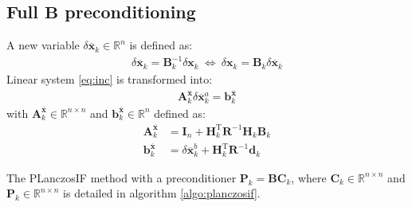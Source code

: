 \documentclass[12pt]{scrartcl}
\begin{document}
\subsection{Full $\mathbf{B}$ preconditioning}
A new variable $\delta \overline{\mathbf{x}}_k \in \mathbb{R}^n$ is defined as:
\begin{align}
\delta \overline{\mathbf{x}}_k = \mathbf{B}_k^{-1} \delta \mathbf{x}_k \ \Leftrightarrow \ \delta \mathbf{x}_k = \mathbf{B}_k \delta \overline{\mathbf{x}}_k
\end{align}
Linear system \eqref{eq:inc} is transformed into:
\begin{align}
\label{eq:inc_B}
\mathbf{A}^{\overline{\mathbf{x}}}_k \delta \overline{\mathbf{x}}^a_k = \mathbf{b}^{\overline{\mathbf{x}}}_k
\end{align}
with $\mathbf{A}^{\overline{\mathbf{x}}}_k \in \mathbb{R}^{n \times n}$ and $\mathbf{b}^{\overline{\mathbf{x}}}_k \in \mathbb{R}^{n}$ defined as:
\begin{align}
\mathbf{A}^{\overline{\mathbf{x}}}_k & = \mathbf{I}_n + \mathbf{H}_k^\mathrm{T} \mathbf{R}^{-1} \mathbf{H}_k \mathbf{B}_k \\
\mathbf{b}^{\overline{\mathbf{x}}}_k & =  \delta \overline{\mathbf{x}}^b_k + \mathbf{H}_k^\mathrm{T} \mathbf{R}^{-1} \mathbf{d}_k
\end{align}


The PLanczosIF method with a preconditioner $\mathbf{P}_k = \mathbf{B}\mathbf{C}_k$, where $\mathbf{C}_k \in \mathbb{R}^{n \times n}$ and $\mathbf{P}_k \in \mathbb{R}^{n \times n}$ is detailed in algorithm \ref{algo:planczosif}.\\
\end{document}
